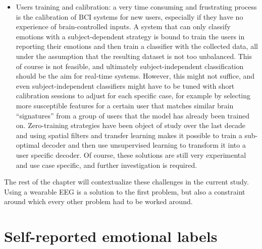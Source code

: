 \begin{itemize}
\item 	Users training and calibration: a very time consuming and frustrating process is the calibration of \ac{BCI} systems for new users, especially if they have no experience of brain-controlled inputs. A system that can only classify emotions with a subject-dependent strategy is bound to train the users in reporting their emotions and then train a classifier with the collected data, all under the assumption that the resulting dataset is not too unbalanced. This of course is not feasible, and ultimately subject-independent classification should be the aim for real-time systems. However, this might not suffice, and even subject-independent classifiers might have to be tuned with short calibration sessions to adjust for each specific case, for example by selecting more susceptible features for a certain user that matches similar brain “signatures” from a group of users that the model has already been trained on. Zero-training strategies \cite{krauledat_towards_2008,jeong_hybrid_2021} have been object of study over the last decade and using spatial filters and transfer learning makes it possible to train a sub-optimal decoder and then use unsupervised learning to transform it into a user specific decoder. Of course, these solutions are still very experimental and use case specific, and further investigation is required.
\end{itemize}

The rest of the chapter will contextualize these challenges in the current study. Using a wearable EEG is a solution to the first problem, but also a constraint around which every other problem had to be worked around.

\section{Self-reported emotional labels}

